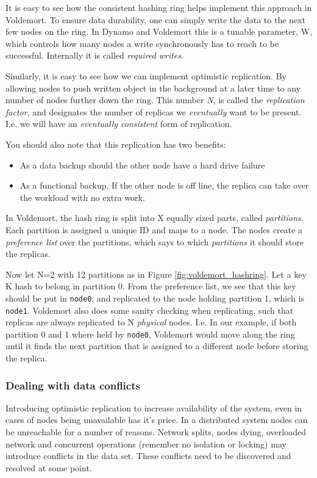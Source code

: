 It is easy to see how the consistent hashing ring helps implement this approach in Voldemort.
To ensure data durability, one can simply write the data to the next few nodes on the ring. In Dynamo and Voldemort this is a tunable parameter, W, which controls how many nodes a write synchronously has to reach to be successful. 
Internally it is called \emph{required writes}.

Similarly, it is easy to see how we can implement optimistic replication.
By allowing nodes to push written object in the background at a later time to any number of nodes further down the ring.
This number \emph{N}, is called the \emph{replication factor}, and designates the number of replicas we \emph{eventually} want to be present.
I.e. we will have an \emph{eventually consistent} form of replication.

You should also note that this replication has two benefits: 
\begin{itemize}
	\item As a data backup should the other node have a hard drive failure
	\item As a functional backup. If the other node is off line, the replica can take over the workload with no extra work.
\end{itemize}

In Voldemort, the hash ring is split into X equally sized parts, called \emph{partitions}. Each partition is assigned a unique ID and maps to a node.
The nodes create a \emph{preference list} over the partitions, which says to which \emph{partitions} it should store the replicas.

Now let N=2 with 12 partitions as in Figure \ref{fig:voldemort_hashring}. 
Let a key K hash to belong in partition 0. From the preference list, we see that this key should be put in \texttt{node0}, and replicated to the node holding partition 1, which is \texttt{node1}.
Voldemort also does some sanity checking when replicating, such that replicas are always replicated to N \emph{physical} nodes. 
I.e. In our example, if both partition 0 and 1 where held by \texttt{node0}, Voldemort would move along the ring until it finds the next partition that is assigned to a different node before storing the replica.

\subsubsection{Dealing with data conflicts}
Introducing optimistic replication to increase availability of the system, even in cases of nodes being unavailable has it's price. 
In a distributed system nodes can be unreachable for a number of reasons.
Network splits, nodes dying, overloaded network and concurrent operations (remember no isolation or locking) may introduce conflicts in the data set.
These conflicts need to be discovered and resolved at some point.

